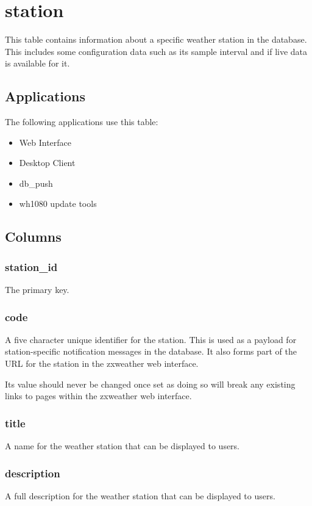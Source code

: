 \documentclass[a4paper,10pt]{book}
\begin{document}
 
\section{station}
\label{tbl_station}
This table contains information about a specific weather station in the database. This includes some configuration data such as its sample interval and if live data is available for it.

\subsection{Applications}
The following applications use this table:
\begin{itemize}
\item Web Interface
\item Desktop Client
\item db\_push
\item wh1080 update tools
\end{itemize}
 
\subsection{Columns}

\subsubsection{station\_id}
The primary key.

\subsubsection{code}
A five character unique identifier for the station. This is used as a payload for station-specific notification messages in the database. It also forms part of the URL for the station in the zxweather web interface.

Its value should never be changed once set as doing so will break any existing links to pages within the zxweather web interface.

\subsubsection{title}
A name for the weather station that can be displayed to users.

\subsubsection{description}
A full description for the weather station that can be displayed to users.
\end{document}
